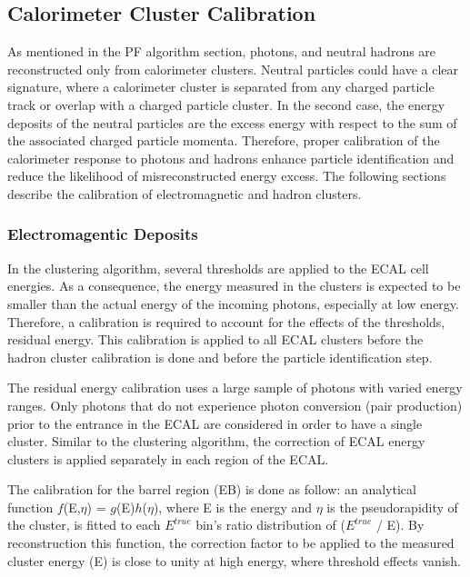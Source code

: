 \subsection{Calorimeter Cluster Calibration}
\label{subsec:calibration}
As mentioned in the PF algorithm section, photons, and neutral hadrons are reconstructed only from calorimeter clusters.
Neutral particles could have a clear signature, where a calorimeter cluster is separated from any charged particle track or overlap with a charged particle cluster.
In the second case, the energy deposits of the neutral particles are the excess energy with respect to the sum of the associated charged particle momenta.
Therefore, proper calibration of the calorimeter response to photons and hadrons enhance particle identification and reduce the likelihood of misreconstructed energy excess.
The following sections describe the calibration of electromagnetic and hadron clusters.

\subsubsection{Electromagentic Deposits}
In the clustering algorithm, several thresholds are applied to the ECAL cell energies.%
As a consequence, the energy measured in the clusters is expected to be smaller than the actual energy of the incoming photons, especially at low energy.
Therefore, a calibration is required to account for the effects of the thresholds, residual energy.
This calibration is applied to all ECAL clusters before the hadron cluster calibration is done and before the particle identification step.

The residual energy calibration uses a large sample of photons with varied energy ranges.
Only photons that do not experience photon conversion (pair production) prior to the entrance in the ECAL are considered in order to have a single cluster.
Similar to the clustering algorithm, the correction of ECAL energy clusters is applied separately in each region of the ECAL.

The calibration for the barrel region (EB) is done as follow:  an analytical function $f$(E,$\eta$) = $g$(E)$h$($\eta$), where E is the energy and $\eta$ is the pseudorapidity of the cluster, is fitted to each $E^{true}$ bin's ratio distribution of ($E^{true}$ / E).
By reconstruction this function, the correction factor to be applied to the measured cluster energy (E) is close to unity at high energy, where threshold effects vanish.

